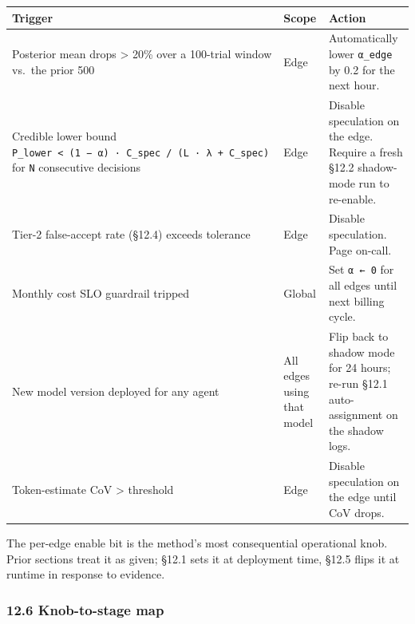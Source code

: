 \documentclass[
  11pt,
]{article}
\newcounter{none} %
\begin{document}
{\def\LTcaptype{none} %
\begin{longtable}[]{@{}
  >{\raggedright\arraybackslash}p{}
  >{\raggedright\arraybackslash}p{}
  >{\raggedright\arraybackslash}p{}@{}}
\toprule\noalign{}
\begin{minipage}[b]{\linewidth}\raggedright
Trigger
\end{minipage} & \begin{minipage}[b]{\linewidth}\raggedright
Scope
\end{minipage} & \begin{minipage}[b]{\linewidth}\raggedright
Action
\end{minipage} \\
\midrule\noalign{}
\endhead
\bottomrule\noalign{}
\endlastfoot
Posterior mean drops \textgreater{} 20\% over a 100-trial window vs.~the
prior 500 & Edge & Automatically lower \texttt{α\_edge} by 0.2 for the
next hour. \\
Credible lower bound
\texttt{P\_lower\ \textless{}\ (1\ −\ α)\ ·\ C\_spec\ /\ (L\ ·\ λ\ +\ C\_spec)}
for \texttt{N} consecutive decisions & Edge & Disable speculation on the
edge. Require a fresh §12.2 shadow-mode run to re-enable. \\
Tier-2 false-accept rate (§12.4) exceeds tolerance & Edge & Disable
speculation. Page on-call. \\
Monthly cost SLO guardrail tripped & Global & Set \texttt{α\ ←\ 0} for
all edges until next billing cycle. \\
New model version deployed for any agent & All edges using that model &
Flip back to shadow mode for 24 hours; re-run §12.1 auto-assignment on
the shadow logs. \\
Token-estimate CoV \textgreater{} threshold & Edge & Disable speculation
on the edge until CoV drops. \\
\end{longtable}
}

The per-edge enable bit is the method's most consequential operational
knob. Prior sections treat it as given; §12.1 sets it at deployment
time, §12.5 flips it at runtime in response to evidence.

\subsubsection{12.6 Knob-to-stage map}\label{knob-to-stage-map}
\end{document}
